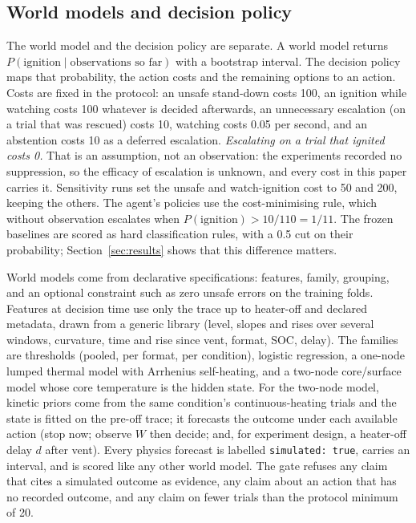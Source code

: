 \documentclass[11pt]{article}
\begin{document}
\subsection{World models and decision policy}
The world model and the decision policy are separate. A world model returns $P(\text{ignition} \mid
\text{observations so far})$ with a bootstrap interval. The decision policy maps that probability, the action costs
and the remaining options to an action. Costs are fixed in the protocol: an unsafe stand-down costs 100, an ignition
while watching costs 100 whatever is decided afterwards, an unnecessary escalation (on a trial that was rescued) costs
10, watching costs 0.05 per second, and an abstention costs 10 as a deferred escalation. \emph{Escalating on a trial
that ignited costs 0.} That is an assumption, not an observation: the experiments recorded no suppression, so the
efficacy of escalation is unknown, and every cost in this paper carries it. Sensitivity runs set the unsafe and
watch-ignition cost to 50 and 200, keeping the others. The agent's policies use the cost-minimising rule, which
without observation escalates when $P(\text{ignition}) > 10/110 = 1/11$. The frozen baselines are scored as hard
classification rules, with a 0.5 cut on their probability; Section~\ref{sec:results} shows that this difference
matters.

World models come from declarative specifications: features, family, grouping, and an optional constraint such as
zero unsafe errors on the training folds. Features at decision time use only the trace up to heater-off and declared
metadata, drawn from a generic library (level, slopes and rises over several windows, curvature, time and rise since
vent, format, SOC, delay). The families are thresholds (pooled, per format, per condition), logistic regression, a
one-node lumped thermal model with Arrhenius self-heating, and a two-node core/surface model whose core temperature is
the hidden state. For the two-node model, kinetic priors come from the same condition's continuous-heating trials and
the state is fitted on the pre-off trace; it forecasts the outcome under each available action (stop now; observe $W$
then decide; and, for experiment design, a heater-off delay $d$ after vent). Every physics forecast is labelled
\texttt{simulated: true}, carries an interval, and is scored like any other world model. The gate refuses any claim
that cites a simulated outcome as evidence, any claim about an action that has no recorded outcome, and any claim on
fewer trials than the protocol minimum of 20.
\end{document}
